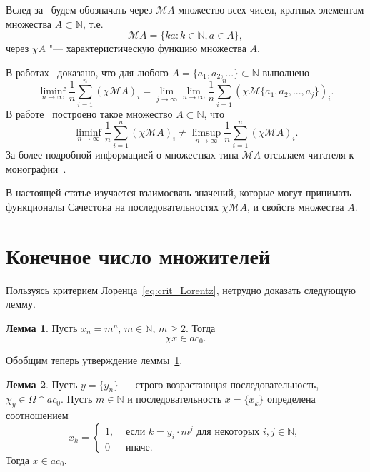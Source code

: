 \documentclass[a4paper,openbib]{article}
\renewcommand{\geq}{\geqslant} %
\theoremstyle{definition}
\newtheorem{lemma}{Лемма}[section]
\begin{document}
Вслед за~\cite{hall1992behrend} будем обозначать через $\mathscr{M}A$ множество всех чисел,
кратных элементам множества $A\subset\mathbb{N}$, т.е.
\begin{equation}
	\mathscr{M}A = \{ka: k\in\mathbb{N}, a\in A\}
	,
\end{equation}
через $\chi A$ "--- характеристическую функцию множества $A$.

В работах~\cite{davenport1936sequences,davenport1951sequences} доказано, что для любого
$A=\{a_1,a_2,...\}\subset\mathbb{N}$
выполнено
\begin{equation}
	\liminf_{n\to\infty}\frac1{n}\sum_{i=1}^n (\chi\mathscr{M}A)_i =
	\lim_{j\to\infty}\lim_{n\to\infty}\frac1{n}\sum_{i=1}^n (\chi\mathscr{M}\{a_1,a_2,...,a_j\})_i
	.
\end{equation}
В работе~\cite[\S 7]{besicovitch1935density} построено такое множество $A\subset\mathbb{N}$, что
\begin{equation}
	\liminf_{n\to\infty}\frac1{n}\sum_{i=1}^n (\chi\mathscr{M}A)_i \neq
	\limsup_{n\to\infty}\frac1{n}\sum_{i=1}^n (\chi\mathscr{M}A)_i
	.
\end{equation}
За более подробной информацией о множествах типа $\mathscr{M}A$ отсылаем читателя к монографии~\cite{hall1996multiples}.

В настоящей статье изучается взаимосвязь значений, которые могут принимать функционалы Сачестона
на последовательностях $\chi\mathscr{M}A$, и свойств множества $A$.





\section{Конечное число множителей}

Пользуясь критерием Лоренца~\eqref{eq:crit_Lorentz},
нетрудно доказать следующую лемму.

\begin{lemma}
	\label{lem:simple_powers_in_ac0}
	Пусть $x_n = m^n$, $m\in\mathbb{N}$, $m\geq 2$.
	Тогда
	\begin{equation}
		\chi x \in ac_0
		.
	\end{equation}
\end{lemma}

Обобщим теперь утверждение леммы~\ref{lem:simple_powers_in_ac0}.

\begin{lemma}
	Пусть $y = \{y_n\}$ --- строго возрастающая последовательность,
	$\chi_y\in\Omega \cap ac_0$.
	Пусть $m \in \mathbb{N}$
	и последовательность $x=\{x_k\}$ определена соотношением
	\begin{equation}
		x_k = \begin{cases}
			1, &\mbox{~если~} k = y_i \cdot m^j \mbox{~для некоторых~} i,j\in\mathbb{N},
			\\
			0  &\mbox{~иначе}
			.
		\end{cases}
	\end{equation}
	Тогда $x\in ac_0$.
\end{lemma}
\end{document}
